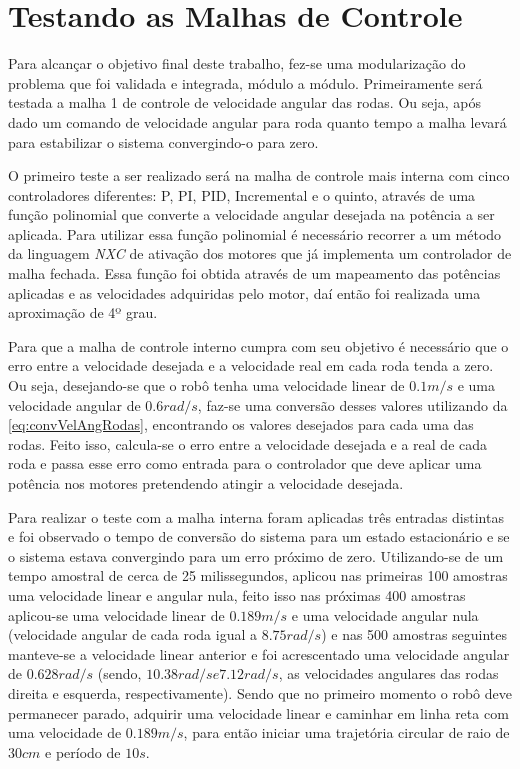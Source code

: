 \chapter{Testando as Malhas de Controle}
\label{chap:testesMalhas}
Para alcançar o objetivo final deste trabalho, fez-se uma modularização do problema que foi validada e integrada, módulo a módulo. Primeiramente será testada a malha 1 de controle de velocidade angular das rodas. Ou seja, após dado um comando de velocidade angular para roda quanto tempo a malha levará para estabilizar o sistema convergindo-o para zero. 

O primeiro teste a ser realizado será na malha de controle mais interna com cinco controladores diferentes: P, PI, PID, Incremental e o quinto, através de uma função polinomial que converte a velocidade angular desejada na potência a ser aplicada. Para utilizar essa função polinomial é necessário recorrer a um método da linguagem \emph{NXC} de ativação dos motores que já implementa um controlador de malha fechada. Essa função foi obtida através de um mapeamento das potências aplicadas e as velocidades adquiridas pelo motor, daí então foi realizada uma aproximação de 4º grau. %

Para que a malha de controle interno cumpra com seu objetivo é necessário que o erro entre a velocidade desejada e a velocidade real em cada roda tenda a zero. Ou seja, desejando-se que o robô tenha uma velocidade linear de $0.1 m/s$ e uma velocidade angular de $0.6 rad/s$, faz-se uma conversão desses valores utilizando da \autoref{eq:convVelAngRodas}, encontrando os valores desejados para cada uma das rodas. Feito isso, calcula-se o erro entre a velocidade desejada e a real de cada roda e passa esse erro como entrada para o controlador que deve aplicar uma potência nos motores pretendendo atingir a velocidade desejada.

Para realizar o teste com a malha interna foram aplicadas três entradas distintas e foi observado o tempo de conversão do sistema para um estado estacionário e se o sistema estava convergindo para um erro próximo de zero. Utilizando-se de um tempo amostral de cerca de 25 milissegundos, aplicou nas primeiras 100 amostras uma velocidade linear e angular nula, feito isso nas próximas 400 amostras aplicou-se uma velocidade linear de $0.189 m/s$ e uma velocidade angular nula (velocidade angular de cada roda igual a $8.75 rad/s$) e nas 500 amostras seguintes manteve-se a velocidade linear anterior e foi acrescentado uma velocidade angular de $0.628 rad/s$ (sendo, $10.38 rad/s e 7.12 rad/s$, as velocidades angulares das rodas direita e esquerda, respectivamente). Sendo que no primeiro momento o robô deve permanecer parado, adquirir uma velocidade linear e caminhar em linha reta com uma velocidade de $0.189 m/s$, para então iniciar uma trajetória circular de raio de $30 cm$ e período de $10 s$.

